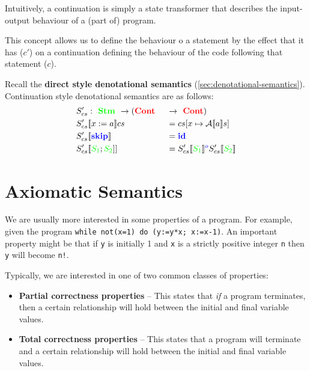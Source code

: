 \documentclass[11pt,a4paper,titlepage,dvipsnames,cmyk]{scrartcl}
\begin{document}
Intuitively, a continuation is simply a state transformer that describes
the input-output behaviour of a (part of) program.

This concept allows us to define the behaviour o a statement  by the
effect that it has ($c'$) on a continuation defining the behaviour of the
code following that statement ($c$).

Recall the \textbf{direct style denotational semantics}
(\ref{sec:denotational-semantics}). Continuation style denotational
semantics are as follows:
\begin{alignat*}{2}
    &S'_{cs} : {\color{green}\textbf{ Stm }} \rightarrow (
    {\color{red}\textbf{Cont }} &&\rightarrow {\color{red}\textbf{ Cont}}) \\
    &S'_{cs} [\![x:=a]\!]c s &&= c s [x \mapsto \mathcal{A}[\![a]\!]s] \\
    &S'_{cs} [\![ {\color{blue}\textbf{skip}}]\!] &&=
    {\color{blue}\textbf{id}} \\
    &S'_{cs}[\![ {\color{green}S_1}; {\color{green}S_2} ]] &&= S'_{cs}[\![
    {\color{green}S_1} ]\!] ^ {\color{blue}o} S'_{cs} [\![
    {\color{green}S_2} ]\!] \\
\end{alignat*}

\newpage
\section{Axiomatic Semantics}%
\label{sec:axiomatic-sem}
We are usually more interested in some properties of a program. For
example, given the program \lstinline|while not(x=1) do (y:=y*x; x:=x-1)|.
An important property might be that if \lstinline|y| is initially 1 and
\lstinline|x|  is a strictly positive integer \lstinline|n| then
\lstinline|y|  will become \lstinline|n!|.

Typically, we are interested in one of two common classes of properties:
\begin{itemize}
    \item \textbf{Partial correctness properties} -- This states that
        \textit{if} a program terminates, then a certain relationship will
        hold between the initial and final variable values.
    \item \textbf{Total correctness properties} -- This states that a
        program will terminate and a certain relationship will hold
        between the initial and final variable values.
\end{itemize}
\end{document}
